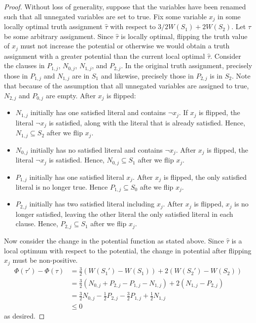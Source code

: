 \documentclass[11pt]{article}
\begin{document}
\begin{enumerate}[leftmargin=16pt]
    \begin{proof}
        Without loss of generality, suppose that the variables have been renamed such that all unnegated variables are set to true. Fix some variable $x_j$ in some locally optimal truth assignment $\hat{\tau}$ with respect to $3/2 W(S_1) + 2W(S_2)$. Let $\tau$ be some arbitrary assignment. Since $\hat{\tau}$ is locally optimal, flipping the truth value of $x_j$ must not increase the potential or otherwise we would obtain a truth assignment with a greater potential than the current local optimal $\hat{\tau}$. Consider the clauses in $P_{1,j}$, $N_{0,j}$, $N_{1,j}$, and $P_{2,j}$. In the original truth assignment, precisely those in $P_{1,j}$ and $N_{1,j}$ are in $S_1$ and likewise, precisely those in $P_{2,j}$ is in $S_2$. Note that because of the assumption that all unnegated variables are assigned to true, $N_{2,j}$ and $P_{0,j}$ are empty. After $x_j$ is flipped:
        \begin{itemize}
            \item $N_{1,j}$ initially has one satisfied literal and contains $\neg x_j$. If $x_j$ is flipped, the literal $\neg x_j$ is satisfied, along with the literal that is already satisfied. Hence, $N_{1,j} \subseteq S_2$ after we flip $x_j$.
            \item $N_{0,j}$ initially has no satisfied literal and contains $\neg x_j$. After $x_j$ is flipped, the literal $\neg x_j$ is satisfied. Hence, $N_{0,j} \subseteq S_1$ after we flip $x_j$.
            \item $P_{1,j}$ initially has one satisfied literal $x_j$. After $x_j$ is flipped, the only satisfied literal is no longer true. Hence $P_{1,j} \subseteq S_0$ afte we flip $x_j$.
            \item $P_{2,j}$ initially has two satisfied literal including $x_j$. After $x_j$ is flipped, $x_j$ is no longer satisfied, leaving the other literal the only satisfied literal in each clause. Hence, $P_{2,j} \subseteq S_1$ after we flip $x_j$.
        \end{itemize}
        Now consider the change in the potential function as stated above. Since $\hat{\tau}$ is a local optimum with respect to the potential, the change in potential after flipping $x_j$ must be non-positive.
        $$
        \begin{aligned}
            \Phi(\tau') - \Phi(\tau) &= \frac{3}{2} \left( W(S_1') - W(S_1) \right) + 2\left( W(S_2') - W(S_2) \right) \\
            &= \frac{3}{2} \left( N_{0,j} + P_{2,j} - P_{1,j} - N_{1,j} \right) + 2 \left( N_{1,j} - P_{2,j} \right)  \\
            &= \frac{3}{2} N_{0,j} - \frac{1}{2} P_{2,j} - \frac{3}{2} P_{1,j} + \frac{1}{2} N_{1,j} \\
            &\leq 0
        \end{aligned}
        $$
        as desired.
    \end{proof}


\end{enumerate}
\end{document}
